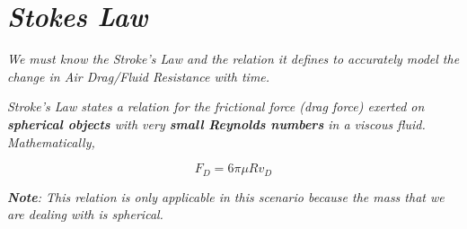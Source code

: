             
            
            
		
            
            
\section{\textit{Stokes Law}}\label{slaw}
            
    \textit{We must know the Stroke's Law and the relation it defines to accurately model the change in Air Drag/Fluid Resistance with time.}
            
    \textit{Stroke's Law states a relation for the frictional force (drag force) exerted on \textbf{spherical objects} with very \textbf{small Reynolds numbers} in a viscous fluid. Mathematically,}
            
        $$F_D = 6\pi\mu Rv_D$$
            
    \textit{\textbf{Note}: This relation is only applicable in this scenario because the mass that we are dealing with is spherical.}
            
